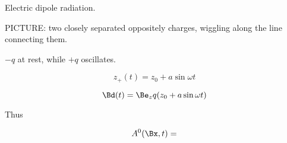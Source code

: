 Electric dipole radiation.

PICTURE: two closely separated oppositely charges, wiggling along the line connecting them.

$-q$ at rest, while $+q$ oscillates.

\begin{equation}\label{eqn:relativisticElectrodynamicsL20:270}
z_+(t) = z_0 + a \sin\omega t
\end{equation}

\begin{equation}\label{eqn:relativisticElectrodynamicsL20:290}
\Bd(t) = \Be_z q (z_0 + a \sin\omega t)
\end{equation}

Thus

\begin{equation}\label{eqn:relativisticElectrodynamicsL20:310}
A^0(\Bx, t) = 
\end{equation}

\EndArticle
